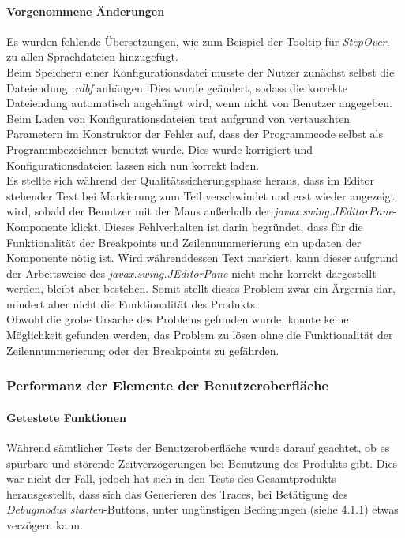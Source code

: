 \documentclass[parskip=full]{scrartcl}
\begin{document}
\paragraph{Vorgenommene Änderungen}
Es wurden fehlende Übersetzungen, wie zum Beispiel der Tooltip für \textit{StepOver}, zu allen Sprachdateien hinzugefügt. \\
Beim Speichern einer Konfigurationsdatei musste der Nutzer zunächst selbst die Dateiendung \textit{.rdbf} anhängen. Dies wurde geändert, sodass die korrekte Dateiendung automatisch angehängt wird, wenn nicht von Benutzer angegeben. \\ 
Beim Laden von Konfigurationsdateien trat aufgrund von vertauschten Parametern im Konstruktor der Fehler auf, dass der Programmcode selbst als Programmbezeichner benutzt wurde. Dies wurde korrigiert und Konfigurationsdateien lassen sich nun korrekt laden. \\
Es stellte sich während der Qualitätssicherungsphase heraus, dass im Editor stehender Text bei Markierung zum Teil verschwindet und erst wieder angezeigt wird, sobald der Benutzer mit der Maus außerhalb der \textit{javax.swing.JEditorPane}-Komponente klickt. Dieses Fehlverhalten ist darin begründet, dass für die Funktionalität der Breakpoints und Zeilennummerierung ein updaten der Komponente nötig ist. Wird währenddessen Text markiert, kann dieser aufgrund der Arbeitsweise des \textit{javax.swing.JEditorPane} nicht mehr korrekt dargestellt werden, bleibt aber bestehen. Somit stellt dieses Problem zwar ein Ärgernis dar, mindert aber nicht die Funktionalität des Produkts. \\ Obwohl die grobe Ursache des Problems gefunden wurde, konnte keine Möglichkeit gefunden werden, das Problem zu lösen ohne die Funktionalität der Zeilennummerierung oder der Breakpoints zu gefährden.
\subsubsection{Performanz der Elemente der Benutzeroberfläche}
\paragraph{Getestete Funktionen}
Während sämtlicher Tests der Benutzeroberfläche wurde darauf geachtet, ob es spürbare und störende Zeitverzögerungen bei Benutzung des Produkts gibt. Dies war nicht der Fall, jedoch hat sich in den Tests des Gesamtprodukts herausgestellt, dass sich das Generieren des Traces, bei Betätigung des \textit{Debugmodus starten}-Buttons, unter ungünstigen Bedingungen (siehe 4.1.1) etwas verzögern kann.
\end{document}
